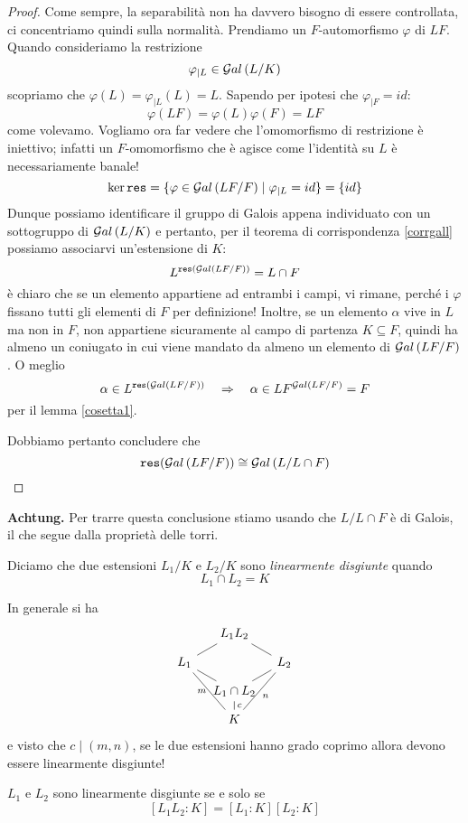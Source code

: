 \begin{multicols}{2}
	\begin{proof}
		Come sempre, la separabilità non ha davvero bisogno di essere controllata, ci concentriamo quindi sulla normalità. Prendiamo un $ F $-automorfismo $ \varphi $ di $ LF $. Quando consideriamo la restrizione
		\[ \varphi_{|L} \in \mathcal{G}al\left( L/K \right) \]
		scopriamo che $ \varphi(L) = \varphi_{|L}(L) = L $. Sapendo per ipotesi che $ \varphi_{|F} = id $: 
		\[ \varphi(LF) = \varphi(L)\varphi(F) = LF \]
		come volevamo. Vogliamo ora far vedere che l'omomorfismo di restrizione
		è iniettivo; infatti un $ F $-omomorfismo che è agisce come l'identità su $ L $ è necessariamente banale!
		\[ \ker \texttt{res} = \{ \varphi \in \mathcal{G}al\left( LF/F \right) \mid \varphi_{|L} = id \} = \{ id \} \]
		Dunque possiamo identificare il gruppo di Galois appena individuato con un sottogruppo di $ \mathcal{G}al\left( L/K \right) $ e pertanto, per il teorema di corrispondenza \ref{corrgall} possiamo associarvi un'estensione di $ K $:
		\[ L^{\texttt{res}(\mathcal{G}al\left( LF/F \right))} = L \cap F \]
		è chiaro che se un elemento appartiene ad entrambi i campi, vi rimane, perché i $ \varphi $ fissano tutti gli elementi di $ F $ per definizione! Inoltre, se un elemento $ \alpha $ vive in $ L $ ma non in $ F $, non appartiene sicuramente al campo di partenza $ K \subseteq F $, quindi ha almeno un coniugato in cui viene mandato da almeno un elemento di $ \mathcal{G}al\left( LF/F \right) $. O meglio
		\[ \alpha \in L^{\texttt{res}(\mathcal{G}al\left( LF/F \right))} \quad\Rightarrow\quad \alpha \in LF^{\mathcal{G}al\left( LF/F \right)} = F \]
		per il lemma \ref{cosetta1}.
		
		Dobbiamo pertanto concludere che
		\[ \texttt{res}(\mathcal{G}al\left( LF/F \right)) \cong \mathcal{G}al\left( L/L\cap F \right) \]
	\end{proof}
	
	\textsf{\textbf{Achtung.} Per trarre questa conclusione stiamo usando che $ L/L\cap F $ è di Galois, il che segue dalla proprietà delle torri.}
	
	\begin{definition}
		Diciamo che due estensioni $ L_1/K $ e $ L_2/K $ sono \emph{linearmente disgiunte} quando
		\[ L_1 \cap L_2 = K \]
	\end{definition}

	\begin{remark}
		In generale si ha
		\[\begin{tikzcd}[row sep=0.25cm, column sep=0.3cm]
		& L_1L_2 \arrow[dl,-] \arrow[dr,-] &  \\
		L_1 \arrow[ddr,-, "m" left] \arrow[dr,-] &  & L_2 \arrow [ddl,-, "n"] \\
		& L_1\cap L_2 \arrow[ur,-] \arrow[d,-, "c"]  & \\
		& K &
		\end{tikzcd} \]
		e visto che $ c \mid (m, n) $, se le due estensioni hanno grado coprimo allora devono essere linearmente disgiunte!
	\end{remark}
	\begin{remark}
		$ L_1 $ e $ L_2 $ sono linearmente disgiunte se e solo se \[ [L_1L_2: K] = [L_1: K][L_2: K] \]
	\end{remark}
	

\end{multicols}
